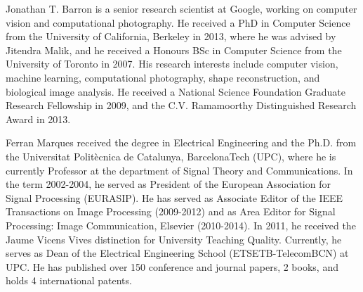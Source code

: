 \documentclass[10pt,journal,cspaper,compsoc]{IEEEtran}
\begin{document}
\begin{IEEEbiography}
{Jonathan T. Barron} is a senior research scientist at Google, working on computer vision and computational photography. He received a PhD in Computer Science from the University of California, Berkeley in 2013, where he was advised by Jitendra Malik, and he received a Honours BSc in Computer Science from the University of Toronto in 2007. His research interests include computer vision, machine learning, computational photography, shape reconstruction, and biological image analysis. He received a National Science Foundation Graduate Research Fellowship in 2009, and the C.V. Ramamoorthy Distinguished Research Award in 2013.
\end{IEEEbiography}

\begin{IEEEbiography}
{Ferran Marques} received the degree in Electrical Engineering and the Ph.D. from the Universitat Polit\`{e}cnica de Catalunya, BarcelonaTech (UPC),
where he is currently Professor at the department of Signal Theory and Communications.
In the term 2002-2004, he served as President of the European Association for Signal Processing (EURASIP).
He has served as Associate Editor of the IEEE Transactions on Image Processing 
(2009-2012) and as Area Editor for Signal Processing: Image 
Communication, Elsevier (2010-2014). In 2011, he received the 
Jaume Vicens Vives distinction for University Teaching Quality. 
Currently, he serves as Dean of the Electrical Engineering School 
(ETSETB-TelecomBCN) at UPC. He has published over 150 conference and 
journal papers, 2 books, and holds 4 international patents.  
\end{IEEEbiography}
\end{document}
